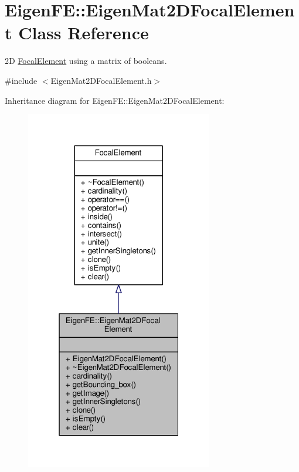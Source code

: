 \hypertarget{classEigenFE_1_1EigenMat2DFocalElement}{}\section{Eigen\+FE\+:\+:Eigen\+Mat2\+D\+Focal\+Element Class Reference}
\label{classEigenFE_1_1EigenMat2DFocalElement}


2D \hyperlink{classFocalElement}{Focal\+Element} using a matrix of booleans.  




{\ttfamily \#include $<$Eigen\+Mat2\+D\+Focal\+Element.\+h$>$}



Inheritance diagram for Eigen\+FE\+:\+:Eigen\+Mat2\+D\+Focal\+Element\+:\nopagebreak
\begin{figure}[H]
\begin{center}
\leavevmode
\includegraphics[width=232pt]{classEigenFE_1_1EigenMat2DFocalElement__inherit__graph}
\end{center}
\end{figure}


